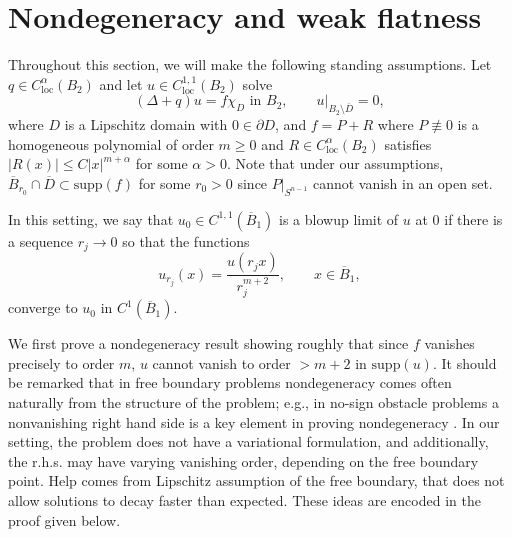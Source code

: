 \documentclass[11pt,a4paper]{amsart}
\theoremstyle{definition}
\numberwithin{equation}{section}
\newcommand{\abs}[1]{\lvert #1 \rvert}          %
\newcommand{\ol}[1]{\overline{#1}}
\newcommand{\supp}{\mathrm{supp}}
\newcommand{\p}{\partial}
\begin{document}
\section{Nondegeneracy and weak flatness} \label{sec_nondegeneracy}


Throughout this section, we will make the following standing assumptions. Let $q \in C^{\alpha}_{\mathrm{loc}}(B_2)$ and let $u \in C^{1,1}_{\mathrm{loc}}(B_2)$ solve 
\[
(\Delta + q) u = f \chi_D \text{ in $B_2$}, \qquad u|_{B_2 \setminus \ol{D}} = 0,
\]
where $D$ is a Lipschitz domain with $0 \in \p D$, and $f = P + R$ where $P \not\equiv 0$ is a homogeneous polynomial of order $m \geq 0$ and $R \in C^{\alpha}_{\mathrm{loc}}(B_2)$ satisfies $\abs{R(x)} \leq C \abs{x}^{m+\alpha}$ for some $\alpha > 0$. Note that under our assumptions, $\ol{B}_{r_0} \cap \ol{D} \subset \supp(f)$ for some $r_0 > 0$ since $P|_{S^{n-1}}$ cannot vanish in an open set.

In this setting, we say that $u_0 \in C^{1,1}(\ol{B}_1)$ is a blowup limit of $u$ at $0$ if there is a sequence $r_j \to 0$ so that the functions 
\[
u_{r_j}(x) = \frac{u(r_j x)}{r_j^{m+2}}, \qquad x \in \ol{B}_1,
\]
converge to $u_0$ in $C^1(\ol{B}_1)$.

We first prove a nondegeneracy result showing roughly that since $f$ vanishes precisely to order $m$, $u$ cannot vanish to order $> m+2$ in $\supp(u)$. 
It should be remarked that in free boundary problems nondegeneracy comes often naturally from the 
structure of the problem; e.g., in no-sign obstacle problems  a nonvanishing  right hand side is a key element in proving nondegeneracy \cite{PSU}.
In our setting, the problem does not have a variational formulation, and additionally, the r.h.s. may have varying vanishing order, depending on the free boundary point. Help comes from Lipschitz assumption of the free boundary, that does not allow solutions to decay faster than expected. These ideas are encoded in the proof given below.
\end{document}
